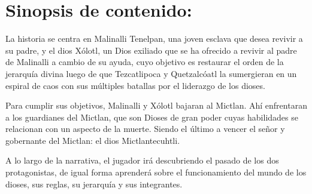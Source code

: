     	\section{Sinopsis de contenido:} 
La historia se centra en Malinalli Tenelpan, una joven esclava que desea revivir a su padre, y el dios Xólotl, un Dios exiliado que se ha ofrecido a revivir al padre de Malinalli a cambio de su ayuda, cuyo objetivo es restaurar el orden de la jerarquía divina luego de que Tezcatlipoca y Quetzalcóatl la sumergieran en un espiral de caos con sus múltiples batallas por el liderazgo de los dioses. 
\\
\par
Para cumplir sus objetivos, Malinalli y Xólotl bajaran al Mictlan. Ahí enfrentaran a los guardianes del Mictlan, que son Dioses de gran poder cuyas habilidades se relacionan con un aspecto de la muerte. Siendo el último a vencer el señor y gobernante del Mictlan: el dios Mictlantecuhtli.
\\
\par
A lo largo de la narrativa, el jugador irá descubriendo el pasado de los dos protagonistas, de igual forma aprenderá sobre el funcionamiento del mundo de los dioses, sus reglas, su jerarquía y sus integrantes.
